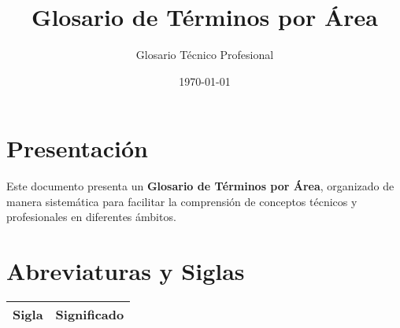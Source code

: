 \documentclass[12pt]{article}
\title{\textbf{Glosario de Términos por Área}}
\author{Glosario Técnico Profesional}
\date{\today}
\begin{document}
\maketitle
\tableofcontents
\section*{Presentación}
Este documento presenta un \textbf{Glosario de Términos por Área}, organizado de manera sistemática para facilitar la comprensión de conceptos técnicos y profesionales en diferentes ámbitos.
\section*{Abreviaturas y Siglas}
\begin{longtable}{>{\raggedright\arraybackslash}p{}>{\raggedright\arraybackslash}p{}}
\toprule
\textbf{Sigla} & \textbf{Significado} \\ \midrule

\end{longtable}
\end{document}
